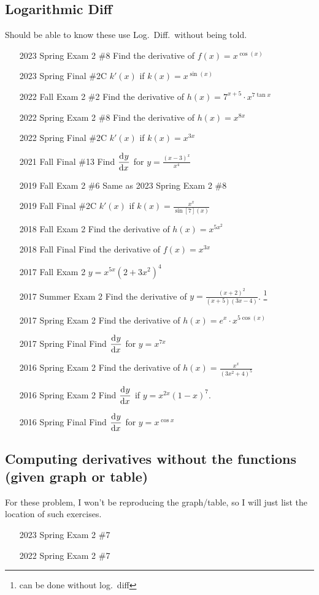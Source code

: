 \documentclass[10pt]{scrartcl}
\theoremstyle{definition}
\begin{document}
\subsection{Logarithmic Diff}
Should be able to know these use Log.\ Diff.\ without being told.

\begin{enumerate}
\item[2023 Spring Exam 2 \#8] Find the derivative of $f(x) = x^{\cos(x)}$
\item[2023 Spring Final \#2C] $k'(x)$ if $k(x) = x^{\sin(x)}$
\item[2022 Fall Exam 2 \#2] Find the derivative of $h(x) = 7^{x+5} \cdot x^{7\tan x}$
\item[2022 Spring Exam 2 \#8] Find the derivative of $h(x) = x^{8x}$
\item[2022 Spring Final \#2C] $k'(x)$ if $k(x) = x^{3x}$
\item[2021 Fall Final \#13] Find $\dod yx$ for $y=\frac{(x-3)^x}{x^4}$
\item[2019 Fall Exam 2 \#6] Same as 2023 Spring Exam 2 \#8
\item[2019 Fall Final \#2C] $k'(x)$ if $k(x) = \frac{x^x}{\sin[7](x)}$
\item[2018 Fall Exam 2] Find the derivative of $h(x) = x^{5x^2}$
\item[2018 Fall Final] Find the derivative of $f(x) = x^{3x}$
\item[2017 Fall Exam 2] $y = x^{5x}(2 + 3x^2)^4$
\item[2017 Summer Exam 2] Find the derivative of $y = \frac{(x+2)^2}{(x+5)(3x-4)}$. \footnote{can be done without log.\ diff}
\item[2017 Spring Exam 2] Find the derivative of $h(x) = e^x \cdot x^{5\cos(x)}$
\item[2017 Spring Final] Find $\dod yx$ for $y = x^{7x}$
\item[2016 Spring Exam 2] Find the derivative of $h(x) = \frac{x^x}{(3x^2+4)^5}$
\item[2016 Spring Exam 2] Find $\dod yx$ if $y = x^{2x}(1-x)^7$.
\item[2016 Spring Final] Find $\dod yx$ for $y=x^{\cos x}$
\end{enumerate}

\subsection{Computing derivatives without the functions (given graph or table)}
For these problem, I won't be reproducing the graph/table, so I will just list the location of such exercises.
\begin{enumerate}
\item [2023 Spring Exam 2 \#7]
\item [2022 Spring Exam 2 \#7]
\end{enumerate}
\end{document}
